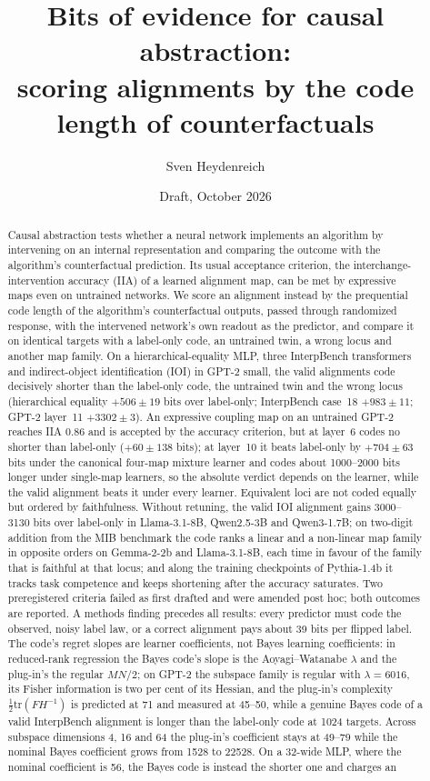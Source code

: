 \documentclass[11pt,a4paper]{article}
\title{Bits of evidence for causal abstraction:\\scoring alignments by the code length of counterfactuals}
\author{Sven Heydenreich}
\date{Draft, October 2026}
\begin{document}
\maketitle

\begin{abstract}
Causal abstraction tests whether a neural network implements an algorithm by intervening on an internal representation and comparing the outcome with the algorithm's counterfactual prediction. Its usual acceptance criterion, the interchange-intervention accuracy (IIA) of a learned alignment map, can be met by expressive maps even on untrained networks. We score an alignment instead by the prequential code length of the algorithm's counterfactual outputs, passed through randomized response, with the intervened network's own readout as the predictor, and compare it on identical targets with a label-only code, an untrained twin, a wrong locus and another map family. On a hierarchical-equality MLP, three InterpBench transformers and indirect-object identification (IOI) in GPT-2 small, the valid alignments code decisively shorter than the label-only code, the untrained twin and the wrong locus (hierarchical equality $+506\pm19$ bits over label-only; InterpBench case~18 $+983\pm11$; GPT-2 layer~11 $+3302\pm3$). An expressive coupling map on an untrained GPT-2 reaches IIA 0.86 and is accepted by the accuracy criterion, but at layer~6 codes no shorter than label-only ($+60\pm138$ bits); at layer~10 it beats label-only by $+704\pm63$ bits under the canonical four-map mixture learner and codes about 1000--2000 bits longer under single-map learners, so the absolute verdict depends on the learner, while the valid alignment beats it under every learner. Equivalent loci are not coded equally but ordered by faithfulness. Without retuning, the valid IOI alignment gains 3000--3130 bits over label-only in Llama-3.1-8B, Qwen2.5-3B and Qwen3-1.7B; on two-digit addition from the MIB benchmark the code ranks a linear and a non-linear map family in opposite orders on Gemma-2-2b and Llama-3.1-8B, each time in favour of the family that is faithful at that locus; and along the training checkpoints of Pythia-1.4b it tracks task competence and keeps shortening after the accuracy saturates. Two preregistered criteria failed as first drafted and were amended post hoc; both outcomes are reported. A methods finding precedes all results: every predictor must code the observed, noisy label law, or a correct alignment pays about 39 bits per flipped label. The code's regret slopes are learner coefficients, not Bayes learning coefficients: in reduced-rank regression the Bayes code's slope is the Aoyagi--Watanabe $\lambda$ and the plug-in's the regular $MN/2$; on GPT-2 the subspace family is regular with $\lambda=6016$, its Fisher information is two per cent of its Hessian, and the plug-in's complexity $\tfrac12\mathrm{tr}(FH^{-1})$ is predicted at 71 and measured at 45--50, while a genuine Bayes code of a valid InterpBench alignment is longer than the label-only code at 1024 targets. Across subspace dimensions 4, 16 and 64 the plug-in's coefficient stays at 49--79 while the nominal Bayes coefficient grows from 1528 to 22528. On a 32-wide MLP, where the nominal coefficient is 56, the Bayes code is instead the shorter one and charges an 
\end{abstract}
\end{document}

